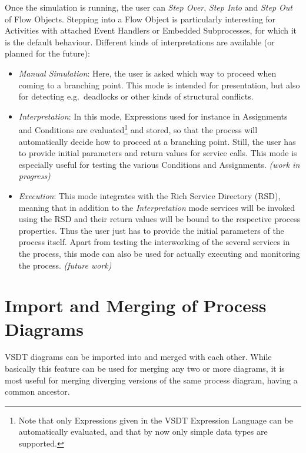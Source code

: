 Once the simulation is running, the user can \emph{Step Over}, \emph{Step Into}
and \emph{Step Out} of Flow Objects.  Stepping into a Flow Object is particularly
interesting for Activities with attached Event Handlers or Embedded Subprocesses,
for which it is the default behaviour.  Different kinds of interpretations are
available (or planned for the future):
\begin{itemize}
	\item \emph{Manual Simulation}: Here, the user is asked which way to proceed
	when coming to a branching point.  This mode is intended for presentation,
	but also for detecting e.g.\ deadlocks or other kinds of structural conflicts.
	
	\item \emph{Interpretation}: In this mode, Expressions used for instance in
	Assignments and Conditions are evaluated\footnote{Note that only Expressions
	given in the VSDT Expression Language can be automatically evaluated, and
	that by now only simple data types are supported.} and stored, so that the
	process will automatically decide how to proceed at a branching point.  Still,
	the user has to provide initial parameters and return values for service
	calls.  This mode is especially useful for testing the various Conditions and
	Assignments. \emph{(work in progress)}
	
	\item \emph{Execution}: This mode integrates with the Rich Service Directory
	(RSD), meaning that in addition to the \emph{Interpretation} mode services
	will be invoked using the RSD and their return values will be bound to the
	respective process properties.  Thus the user just has to provide the initial
	parameters of the process itself.  Apart from testing the interworking of the
	several services in the process, this mode can also be used for actually
	executing and monitoring the process. \emph{(future work)}
\end{itemize}



\section{Import and Merging of Process Diagrams}
\label{sec:user_features_merging}

VSDT diagrams can be imported into and merged with each other.  While basically
this feature can be used for merging any two or more diagrams, it is most useful
for merging diverging versions of the same process diagram, having a common
ancestor.

